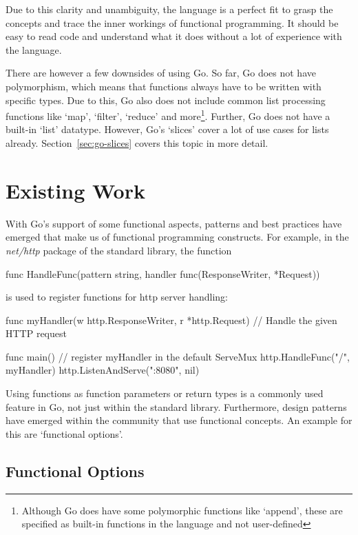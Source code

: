 Due to this clarity and unambiguity, the language is a perfect fit to grasp the concepts and trace
the inner workings of functional programming. It should be easy to read code and understand what
it does without a lot of experience with the language.

There are however a few downsides of using Go. So far, Go does not have polymorphism, which means
that functions always have to be written with specific types. Due to this, Go also does not include
common list processing functions like `map', `filter', `reduce' and more\footnote{Although Go does
	have some polymorphic functions like `append', these are specified as built-in functions in the
language and not user-defined}. Further, Go does not have a built-in `list' datatype. However, Go's
`slices' cover a lot of use cases for lists already. Section~\ref{sec:go-slices} covers this topic
in more detail.

\section{Existing Work}

With Go's support of some functional aspects, patterns and best practices have emerged that make
us of functional programming constructs.
For example, in the \textit{net/http} package of the standard library, the function
\begin{gocode}
func HandleFunc(pattern string, handler func(ResponseWriter, *Request))
\end{gocode}
is used to register functions for http server handling\autocite{go-http-doc}:

\begin{gocode}
func myHandler(w http.ResponseWriter, r *http.Request) {
    // Handle the given HTTP request
}

func main() {
    // register myHandler in the default ServeMux
    http.HandleFunc("/", myHandler)
    http.ListenAndServe(":8080", nil)
}
\end{gocode}

Using functions as function parameters or return types is a commonly used feature in Go, not just
within the standard library. Furthermore, design patterns have emerged within the community
that use functional concepts. An example for this are `functional options'.

\subsection{Functional Options}

